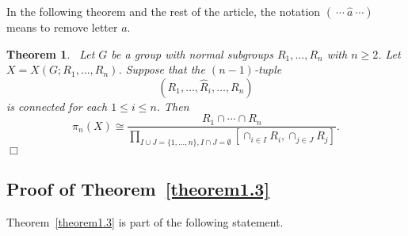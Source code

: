 \documentclass[10pt]{amsart}
\newtheorem{thm}{Theorem}[section]
\numberwithin{equation}{section}
\begin{document}
In the following theorem and the rest of the article, the notation $(\ \cdots \ \hat a \ \cdots)$ means to remove letter $a$.

\begin{thm}~\cite[Theorem 1]{EM}\label{theorem3.1}
Let  $G$  be a group with normal subgroups $R_1,\ldots,R_n$ with $n\geq2$. Let $X=X(G;R_1,\ldots,R_n)$.
Suppose that the $(n-1)$-tuple $$(R_1,\ldots,\hat R_i,\ldots,R_n)$$ is connected for each $1\leq i\leq n$. Then
$$
\pi_n(X) \cong \frac{R_1\cap \cdots \cap R_n}{\prod_{I\cup J=\{1,\ldots,n\},
 {I\cap J=\emptyset}}
[\cap_{i\in I}R_i,\cap_{j\in J}R_j]}.
$$\hfill $\Box$
\end{thm}

\subsection{Proof of Theorem~\ref{theorem1.3}}

Theorem~\ref{theorem1.3} is part of the following statement.
\end{document}
